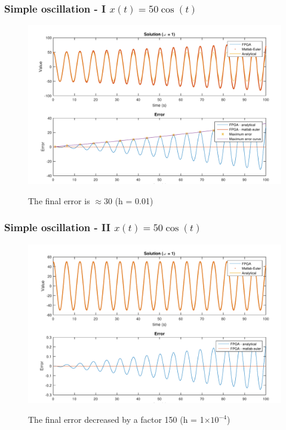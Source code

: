 \documentclass{beamer}[10]
\newcommand{\horspace}{\hspace{15pt}}
\providecommand{\e}[1]{\ensuremath{\times 10^{#1}}}
\begin{document}
\begin{frame}
	\frametitle{Simple oscillation - I \horspace{} $x(t) = 50 \cos(t)$}
	\begin{figure}
		\centering
		\includegraphics[width=\columnwidth]{figs/euler_o1_ts=0,01_os=1}
		\label{f:euler_o1_ts=0,01_os=1}
		\caption{The final error is $\approx 30$ (h = 0.01)}
	\end{figure}
\end{frame}

\begin{frame}
	\frametitle{Simple oscillation - II \horspace{} $x(t) = 50 \cos(t)$}
	\begin{figure}
		\centering
		\includegraphics[width=\columnwidth]{figs/euler_o1_ts=0,0001_os=100}
		\label{f:euler_o1_ts=0,0001_os=100}
		\caption{The final error decreased by a factor 150 (h = 1\e{-4})}
	\end{figure}
\end{frame}
\end{document}
